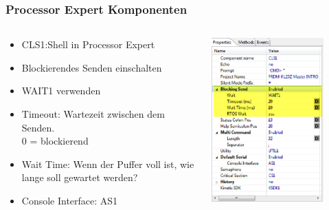 \begin{frame}
  \frametitle{Processor Expert Komponenten}
  	\begin{columns}
	    \begin{column}{0.45\linewidth}
	    	\begin{itemize}
	    	\item CLS1:Shell in Processor Expert
	    	\item Blockierendes Senden einschalten
	    	\item WAIT1 verwenden
	    	\item Timeout: Wartezeit zwischen dem Senden. \\0 = blockierend
	    	\item Wait Time: Wenn der Puffer voll ist, wie lange soll gewartet werden?
	    	\item Console Interface: AS1
	    	\end{itemize}
	    \end{column}
	    \begin{column}{0.45\linewidth}
	    	\begin{center}
	    		\includegraphics[width=0.8\textwidth]{images/CLS1_shell.png}
	    	\end{center}
	    \end{column}
	\end{columns}
\end{frame}


